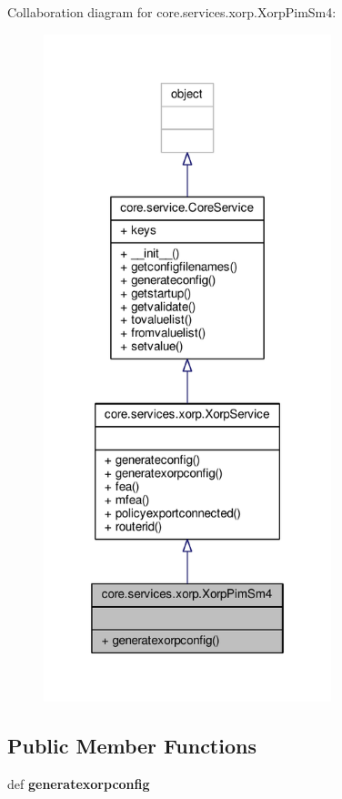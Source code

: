 Collaboration diagram for core.\+services.\+xorp.\+Xorp\+Pim\+Sm4\+:
\nopagebreak
\begin{figure}[H]
\begin{center}
\leavevmode
\includegraphics[height=550pt]{classcore_1_1services_1_1xorp_1_1_xorp_pim_sm4__coll__graph}
\end{center}
\end{figure}
\subsection*{Public Member Functions}
\begin{DoxyCompactItemize}
\item 
\hypertarget{classcore_1_1services_1_1xorp_1_1_xorp_pim_sm4_aa1b1513b95d6e22928bd381afb7b7f6e}{def {\bfseries generatexorpconfig}}\label{classcore_1_1services_1_1xorp_1_1_xorp_pim_sm4_aa1b1513b95d6e22928bd381afb7b7f6e}

\end{DoxyCompactItemize}
